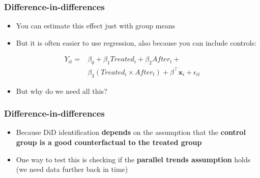 \documentclass[aspectratio=43]{beamer}
\begin{document}
\begin{frame}
\frametitle{Difference-in-differences}
\centering

\begin{itemize}
  \item You can estimate this effect just with group means
  \item But it is often easier to use regression, also because you can include controls:
\end{itemize}

\begin{equation}
\begin{split}
    Y_{it} =&  \beta_0 + \beta_1 Treated_{i} + \beta_2 After_{t} +\\
    &\beta_3 (Treated_{i} \times After_{t}) + \beta^\top \mathbf{x}_{i} + \epsilon_{it}
\end{split}
\end{equation}

\begin{itemize}
  \item But why do we need all this?
\end{itemize}

\end{frame}

\begin{frame}
\frametitle{Difference-in-differences}
\centering

\begin{itemize}
  \item Because DiD identification \textbf{depends} on the assumption that the \textbf{control group is a good counterfactual to the treated group}
\end{itemize}




\begin{itemize}
  \item One way to test this is checking if the \textbf{parallel trends assumption} holds (we need data further back in time)
\end{itemize}

\end{frame}
\end{document}
